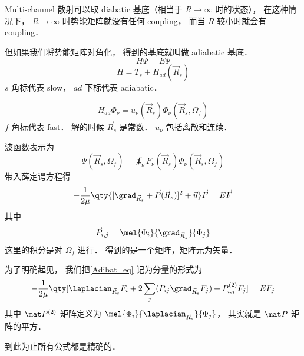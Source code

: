 
Multi-channel 散射可以取 diabatic 基底（相当于 $R\to \infty$ 时的状态）， 在这种情况下， $R\to\infty$ 时势能矩阵就没有任何 coupling， 而当 $R$ 较小时就会有 coupling．

但如果我们将势能矩阵对角化， 得到的基底就叫做 adiabatic 基底．
\begin{equation}
H \Psi = E \Psi
\end{equation}
\begin{equation}
H = T_s + H_{ad}(\vec R_s)
\end{equation}
$s$ 角标代表 slow， $ad$ 下标代表 adiabatic．

\begin{equation}
H_{ad} \Phi_\nu = u_\nu (\vec R_s) \Phi_\nu (\vec R_s, \Omega_f)
\end{equation}
$f$ 角标代表 fast． 解的时候 $\vec R_s$ 是常数． $u_\nu$ 包括离散和连续．

波函数表示为
\begin{equation}
\Psi(\vec R_s, \Omega_f) = \sumint_\nu F_\nu (\vec R_s) \Phi_\nu(\vec R_s, \Omega_f)
\end{equation}
带入薛定谔方程得
\begin{equation}\label{Adibat_eq}
-\frac{1}{2\mu} \qty{[\grad_{\vec R_s} + \vec P(\vec R_s)]^2 + \vec u} \vec F = E \vec F
\end{equation}
其中
\begin{equation}
\vec P_{i,j} = \mel{\Phi_i}{\grad_{\vec R_s}}{\Phi_j}
\end{equation}
这里的积分是对 $\Omega_f$ 进行． 得到的是一个矩阵，矩阵元为矢量．

为了明确起见， 我们把\autoref{Adibat_eq} 记为分量的形式为
\begin{equation}
-\frac{1}{2\mu} \qty[\laplacian_{\vec R_s} F_i + 2\sum_j ( P_{ij} \grad_{\vec R_s} F_j) + P_{i,j}^{(2)} F_j] = E F_j
\end{equation}
其中 $\mat P^{(2)}$ 矩阵定义为 $\mel{\Phi_i}{\laplacian_{\vec R_s}}{\Phi_j}$， 其实就是 $\mat P$ 矩阵的平方．

到此为止所有公式都是精确的．

